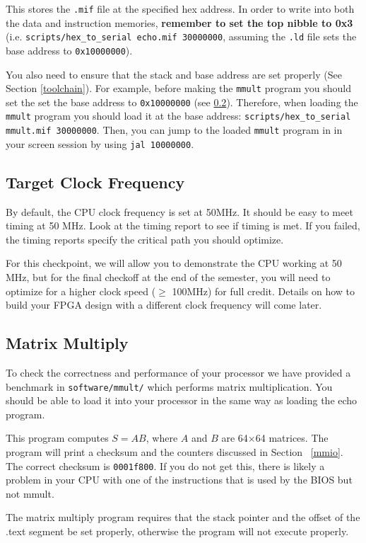 \documentclass[11pt]{article}
\begin{document}
This stores the \verb|.mif| file at the specified hex address.
In order to write into both the data and instruction memories, \textbf{remember to set the top nibble to 0x3} (i.e. \verb|scripts/hex_to_serial echo.mif 30000000|, assuming the \verb|.ld| file sets the base address to \verb|0x10000000|).

You also need to ensure that the stack and base address are set properly (See Section \ref{toolchain}).
For example, before making the \verb|mmult| program you should set the set the base address to \verb|0x10000000| (see \ref{mmult}).
Therefore, when loading the \verb|mmult| program you should load it at the base address: \verb|scripts/hex_to_serial mmult.mif 30000000|.
Then, you can jump to the loaded \verb|mmult| program in in your screen session by using \verb|jal 10000000|.

\subsection{Target Clock Frequency}
By default, the CPU clock frequency is set at 50MHz.
It should be easy to meet timing at 50 MHz.
Look at the timing report to see if timing is met.
If you failed, the timing reports specify the critical path you should optimize.

For this checkpoint, we will allow you to demonstrate the CPU working at 50 MHz, but for the final checkoff at the end of the semester, you will need to optimize for a higher clock speed ($\geq$ 100MHz) for full credit.
Details on how to build your FPGA design with a different clock frequency will come later.

\subsection{Matrix Multiply}
\label{mmult}
To check the correctness and performance of your processor we have provided a benchmark in \verb|software/mmult/| which performs matrix multiplication.
You should be able to load it into your processor in the same way as loading the echo program.

This program computes $S=AB$, where $A$ and $B$ are 64$\times$64 matrices.
The program will print a checksum and the counters discussed in Section ~\ref{mmio}.
The correct checksum is \verb|0001f800|.
If you do not get this, there is likely a problem in your CPU with one of the instructions that is used by the BIOS but not mmult.

The matrix multiply program requires that the stack pointer and the offset of the .text segment be set properly, otherwise the program will not execute properly.
\end{document}
